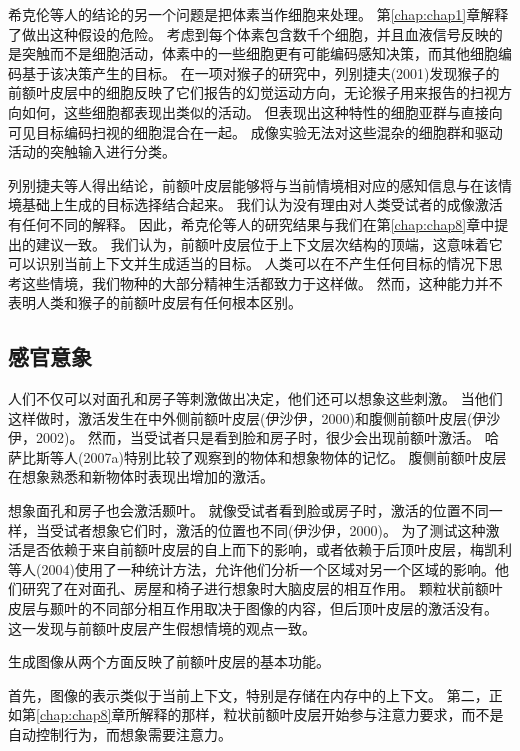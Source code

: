 希克伦等人的结论的另一个问题是把体素当作细胞来处理。
第\ref{chap:chap1}章解释了做出这种假设的危险。
考虑到每个体素包含数千个细胞，并且血液信号反映的是突触而不是细胞活动，体素中的一些细胞更有可能编码感知决策，而其他细胞编码基于该决策产生的目标。
在一项对猴子的研究中，列别捷夫(2001)发现猴子的前额叶皮层中的细胞反映了它们报告的幻觉运动方向，无论猴子用来报告的扫视方向如何，这些细胞都表现出类似的活动。
但表现出这种特性的细胞亚群与直接向可见目标编码扫视的细胞混合在一起。
成像实验无法对这些混杂的细胞群和驱动活动的突触输入进行分类。
\par


列别捷夫等人得出结论，前额叶皮层能够将与当前情境相对应的感知信息与在该情境基础上生成的目标选择结合起来。
我们认为没有理由对人类受试者的成像激活有任何不同的解释。
因此，希克伦等人的研究结果与我们在第\ref{chap:chap8}章中提出的建议一致。
我们认为，前额叶皮层位于上下文层次结构的顶端，这意味着它可以识别当前上下文并生成适当的目标。
人类可以在不产生任何目标的情况下思考这些情境，我们物种的大部分精神生活都致力于这样做。
然而，这种能力并不表明人类和猴子的前额叶皮层有任何根本区别。



\subsection{感官意象}
\par

人们不仅可以对面孔和房子等刺激做出决定，他们还可以想象这些刺激。
当他们这样做时，激活发生在中外侧前额叶皮层(伊沙伊，2000)和腹侧前额叶皮层(伊沙伊，2002)。
然而，当受试者只是看到脸和房子时，很少会出现前额叶激活。
哈萨比斯等人(2007a)特别比较了观察到的物体和想象物体的记忆。
腹侧前额叶皮层在想象熟悉和新物体时表现出增加的激活。
\par


想象面孔和房子也会激活颞叶。
就像受试者看到脸或房子时，激活的位置不同一样，当受试者想象它们时，激活的位置也不同(伊沙伊，2000)。
为了测试这种激活是否依赖于来自前额叶皮层的自上而下的影响，或者依赖于后顶叶皮层，梅凯利等人(2004)使用了一种统计方法，允许他们分析一个区域对另一个区域的影响。他们研究了在对面孔、房屋和椅子进行想象时大脑皮层的相互作用。
颗粒状前额叶皮层与颞叶的不同部分相互作用取决于图像的内容，但后顶叶皮层的激活没有。
这一发现与前额叶皮层产生假想情境的观点一致。
\par


生成图像从两个方面反映了前额叶皮层的基本功能。
\par


首先，图像的表示类似于当前上下文，特别是存储在内存中的上下文。
第二，正如第\ref{chap:chap8}章所解释的那样，粒状前额叶皮层开始参与注意力要求，而不是自动控制行为，而想象需要注意力。
\par


